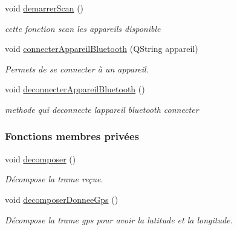 \begin{DoxyCompactItemize}
\item 
void \hyperlink{class_transmission_a217b97344fdad09dbe226c55a8ac56b0}{demarrer\+Scan} ()
\begin{DoxyCompactList}\small\item\em cette fonction scan les appareils disponible \end{DoxyCompactList}\item 
void \hyperlink{class_transmission_a5a21d201dd0096f96aec12264c2f03d9}{connecter\+Appareil\+Bluetooth} (Q\+String appareil)
\begin{DoxyCompactList}\small\item\em Permets de se connecter à un appareil. \end{DoxyCompactList}\item 
void \hyperlink{class_transmission_afc5d716d53ee7039c3abf05f799327ae}{deconnecter\+Appareil\+Bluetooth} ()
\begin{DoxyCompactList}\small\item\em methode qui deconnecte l\textquotesingle{}appareil bluetooth connecter \end{DoxyCompactList}\end{DoxyCompactItemize}
\subsubsection*{Fonctions membres privées}
\begin{DoxyCompactItemize}
\item 
void \hyperlink{class_transmission_aa2977705ec793b10bf3212a13e67b097}{decomposer} ()
\begin{DoxyCompactList}\small\item\em Décompose la trame reçue. \end{DoxyCompactList}\item 
void \hyperlink{class_transmission_acc25e99cce910d23efe684cad233d30e}{decomposer\+Donnee\+Gps} ()
\begin{DoxyCompactList}\small\item\em Décompose la trame gps pour avoir la latitude et la longitude. \end{DoxyCompactList}\end{DoxyCompactItemize}

